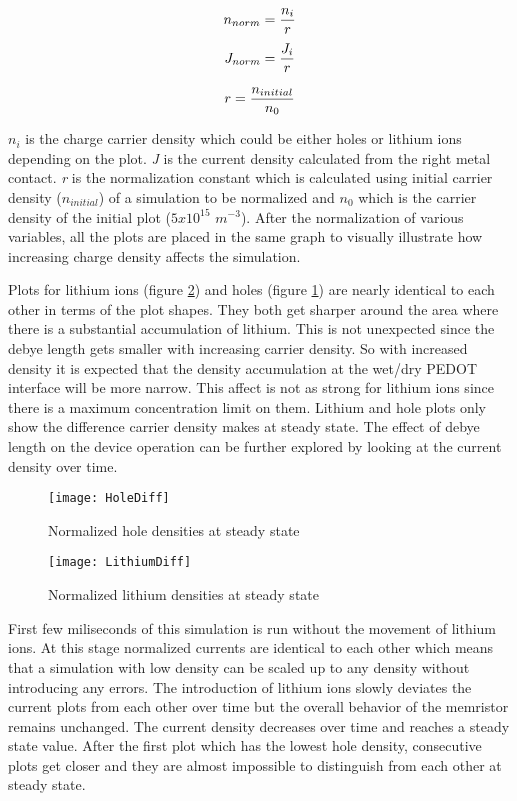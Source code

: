 \begin{doublespace}
\begin{equation}
\centering
n_{norm}= \frac{n_i}{r} 
\end{equation}
\begin{equation}
\centering
J_{norm}= \frac{J_i}{r} 
\end{equation}

\begin{equation}
\centering
r = \frac{n_{initial}}{n_{0}}
\label{NormConst}
\end{equation}

$n_{i}$ is the charge carrier density which could be either holes or lithium ions depending on the plot. \textit{J} is the current density calculated from the right metal contact. \textit{r} is the normalization constant which is calculated using initial carrier density ($n_{initial}$) of a simulation to be normalized and $n_{0}$ which is the carrier density of the initial plot ($5 x 10^{15}$ $m^{-3}$). After the normalization of various variables, all the plots are placed in the same graph to visually illustrate how increasing charge density affects the simulation. 

Plots for lithium ions (figure \ref{LithiumDiff}) and holes (figure \ref{HoleDiff}) are nearly identical to each other in terms of the plot shapes. They both get sharper around the area where there is a substantial accumulation of lithium. This is not unexpected since the debye length gets smaller with increasing carrier density. So with increased density it is expected that the density accumulation at the wet/dry PEDOT interface will be more narrow. This affect is not as strong for lithium ions since there is a maximum concentration limit on them. Lithium and hole plots only show the difference carrier density makes at steady state. The effect of debye length on the device operation can be further explored by looking at the current density over time.   

\begin{figure}[!htp]
\centering
\texttt{[image: HoleDiff]}
\caption{Normalized hole densities at steady state} 
\label{HoleDiff}
\end{figure}

\begin{figure}[!htp]
\centering
\texttt{[image: LithiumDiff]}
\caption{Normalized lithium densities at steady state} 
\label{LithiumDiff}
\end{figure}

First few miliseconds of this simulation is run without the movement of lithium ions. At this stage normalized currents are identical to each other which means that a simulation with low density can be scaled up to any density without introducing any errors. The introduction of lithium ions slowly deviates the current plots from each other over time but the overall behavior of the memristor remains unchanged. The current density decreases over time and reaches a steady state value. After the first plot which has the lowest hole density, consecutive plots get closer and they are almost impossible to distinguish from each other at steady state.


\end{doublespace}
